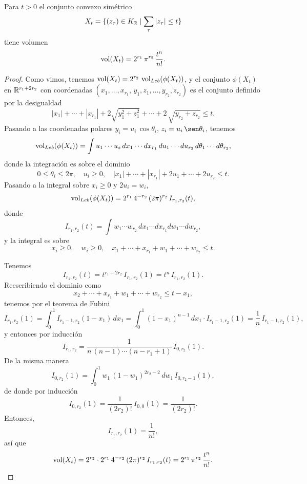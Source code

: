 \begin{lema}
  Para $t > 0$ el conjunto convexo simétrico
  $$X_t = \{ (z_\tau) \in K_{\mathbb{R}} \mid \sum_\tau |z_\tau| \le t \}$$
  tiene volumen
  $$\operatorname{vol} (X_t) = 2^{r_1}\,\pi^{r_2}\,\frac{t^n}{n!}.$$

  \begin{proof}
    Como vimos, tenemos $\operatorname{vol} (X_t) = 2^{r_2}\,\operatorname{vol}_{Leb} (\phi (X_t))$,
    y el conjunto $\phi (X_t)$ en $\mathbb{R}^{r_1 + 2r_2}$ con coordenadas
    $(x_1, \ldots, x_{r_1}, \, y_1, z_1, \ldots, y_{r_2}, z_{r_2})$
    es el conjunto definido por la desigualdad
    $$|x_1| + \cdots + |x_{r_1}| + 2\sqrt{y_1^2 + z_1^2} + \cdots + 2\,\sqrt{y_{r_2} + z_{r_2}} \le t.$$
    Pasando a las coordenadas polares $y_i = u_i \, \cos \theta_i$,
    $z_i = u_i \, \sen \theta_i$, tenemos
    $$\operatorname{vol}_{Leb} (\phi (X_t)) = \int u_1 \cdots u_s\,dx_1 \cdots dx_{r_1}\,du_1 \cdots du_{r_2}\,d\theta_1 \cdots d \theta_{r_2},$$
    donde la integración es sobre el dominio
    \[ 0 \le \theta_i \le 2\pi, \quad u_i \ge 0, \quad
       |x_1| + \cdots + |x_{r_1}| + 2u_1 + \cdots + 2u_{r_2} \le t. \]
    Pasando a la integral sobre $x_i \ge 0$ y $2 u_i = w_i$,
    $$\operatorname{vol}_{Leb} (\phi (X_t)) = 2^{r_1}\,4^{-r_2}\,(2\pi)^{r_2}\,I_{r_1,r_2} (t),$$
    donde
    $$I_{r_1,r_2} (t) = \int w_1 \cdots w_{r_2} \, dx_1\cdots d x_{r_1} d w_1\cdots d w_{r_2},$$
    y la integral es sobre
    \[ x_i \ge 0, \quad w_i \ge 0, \quad
       x_1 + \cdots + x_{r_1} + w_1 + \cdots + w_{r_2} \le t. \]

    Tenemos
    $$I_{r_1,r_2} (t) = t^{r_1 + 2r_2} \, I_{r_1,r_2} (1) = t^n \, I_{r_1,r_2} (1).$$
    Reescribiendo el dominio como
    $$x_2 + \cdots + x_{r_1} + w_1 + \cdots + w_{r_2} \le t - x_1,$$
    tenemos por el teorema de Fubini
    $$I_{r_1, r_2} (1) = \int_0^1 I_{r_1-1,r_2} (1 - x_1)\,dx_1 = \int_0^1 (1 - x_1)^{n-1}\,dx_1 \cdot I_{r_1-1, r_2} (1) = \frac{1}{n}\,I_{r_1-1,r_2} (1),$$
    y entonces por inducción
    $$I_{r_1,r_2} = \frac{1}{n\,(n-1)\cdots (n - r_1 + 1)}\,I_{0,r_2} (1).$$
    De la misma manera
    $$I_{0,r_2} (1) = \int_0^1 w_1 \, (1-w_1)^{2r_2 - 2} \, dw_1 \, I_{0,r_2-1} (1),$$
    de donde por inducción
    $$I_{0,r_2} (1) = \frac{1}{(2r_2)!} \, I_{0,0} (1) = \frac{1}{(2r_2)!}.$$
    Entonces,
    $$I_{r_1, r_2} (1) = \frac{1}{n!},$$
    así que
    \[ \operatorname{vol} (X_t) = 2^{r_2} \cdot 2^{r_1}\,4^{-r_2}\,(2\pi)^{r_2}\,I_{r_1,r_2} (t) =
       2^{r_1}\,\pi^{r_2}\,\frac{t^n}{n!}. \qedhere \]
  \end{proof}
\end{lema}

